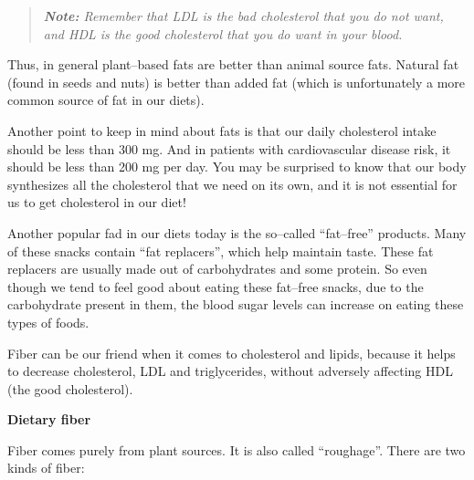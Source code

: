 \begin{quote}
\textit{\textbf{Note:} Remember that LDL is the bad cholesterol that you do not want, and HDL is the good cholesterol that you do want in your blood.}
\end{quote}

Thus, in general plant–based fats are better than animal source fats. Natural fat (found in seeds and nuts) is better than added fat (which is unfortunately a more common source of fat in our diets).

Another point to keep in mind about fats is that our daily chole\-sterol intake should be less than 300 mg. And in patients with cardiovascular disease risk, it should be less than 200 mg per day. You may be surprised to know that our body synthesizes all the cholesterol that we need on its own, and it is not essential for us to get cholesterol in our diet!

Another popular fad in our diets today is the so–called “fat–free” products. Many of these snacks contain “fat replacers”, which help maintain taste. These fat replacers are usually made out of carbohydrates and some protein. So even though we tend to feel good about eating these fat–free snacks, due to the carbohydrate present in them, the blood sugar levels can increase on eating these types of foods.

Fiber can be our friend when it comes to cholesterol and lipids, because it helps to decrease cholesterol, LDL and triglycerides, without adversely affecting HDL (the good cholesterol).

\noindent\textbf{Dietary fiber}

Fiber comes purely from plant sources. It is also called “roughage”. There are two kinds of fiber:

